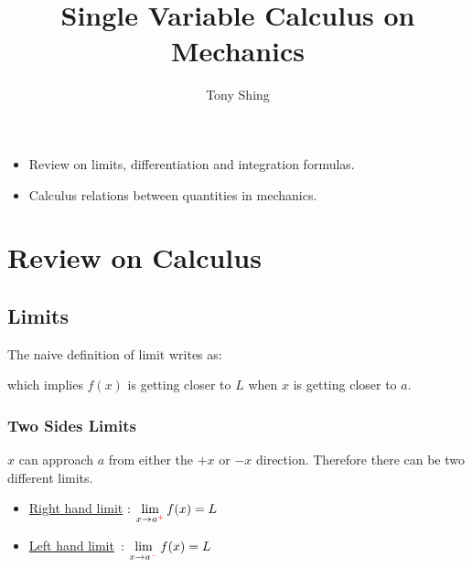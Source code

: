 \documentclass[class=article, crop=false, 12pt]{standalone}
\author{Tony Shing}
\title{Single Variable Calculus on Mechanics}
\begin{document}
\maketitle


\begin{overview}
    \begin{itemize}
        \item Review on limits, differentiation and integration formulas. 
        \item Calculus relations between quantities in mechanics.
    \end{itemize}
\end{overview}

\iffalse
\begin{notation}
    \begin{enumerate}
        \item blah
    \end{enumerate}
\end{notation}
\fi


\section{Review on Calculus}

\subsection{Limits}
The naive definition of limit writes as:


which implies $f(x)$ is getting closer to $L$ when $x$ is getting closer to $a$.


\subsubsection{Two Sides Limits}

$x$ can approach $a$ from either the $+x$ or $-x$ direction. 
Therefore there can be two different limits.

\begin{itemize}
    \item \underline{Right hand limit} : $\displaystyle \lim_{x\to a^{\color{red}{+}}} f(x) = L$
    \item \underline{Left hand limit}\ : $\displaystyle \lim_{x\to a^{\color{red}{-}}} f(x) = L$
\end{itemize}
\end{document}
